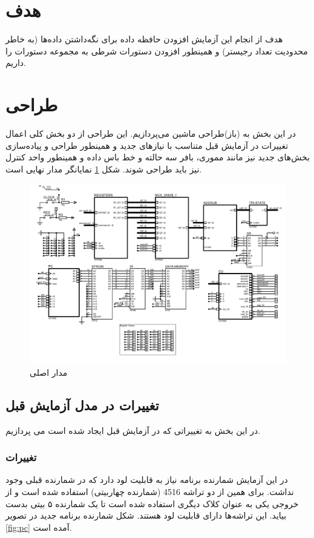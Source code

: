 \documentclass{article}
\begin{document}
\section{هدف}
هدف از انجام این آزمایش افزودن حافظه داده برای نگه‌داشتن داده‌ها (به خاطر محدودیت تعداد رجیستر) و همینطور افزودن دستورات شرطی به مجموعه دستورات را داریم.

\section{طراحی}
در این بخش به (باز)طراحی ماشین می‌پردازیم. این طراحی از دو بخش کلی اعمال تغییرات در آزمایش قبل متناسب با نیاز‌های جدید و همینطور طراحی و پیاده‌سازی بخش‌های جدید نیز مانند مموری، بافر سه ‌حالته و خط باس داده و همینطور واحد کنترل نیز باید طراحی شوند. شکل \ref{fig:main} نمایانگر مدار نهایی است.

\begin{figure}
	\centering
	\includegraphics[scale=0.5,page=1]{./graphics/graphics}
	\caption{مدار اصلی}
	\label{fig:main}
\end{figure}
\subsection{تغییرات در مدل آزمایش قبل}
در این بخش به تغییراتی که در آزمایش قبل ایجاد شده است می پردازیم.

\subsubsection{تغییرات }
در این آزمایش شمارنده برنامه نیاز به قابلیت لود دارد که در شمارنده قبلی وجود نداشت. برای همین از دو تراشه 4516 (شمارنده چهاربیتی) استفاده شده است و از خروجی یکی به عنوان کلاک دیگری استفاده شده است تا یک شمارنده ۵ بیتی بدست بیاید. این تراشه‌ها دارای قابلیت لود هستند. شکل شمارنده برنامه جدید در تصویر \ref{fig:pc} آمده است.
\end{document}
